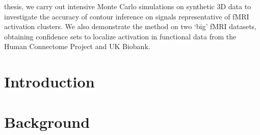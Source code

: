 \documentclass[11pt,a4paper]{report}      %
\begin{document}
\begin{thesisabstract}
\begin{singlespace}
thesis, we carry out intensive Monte Carlo simulations on synthetic 3D data to investigate the accuracy of contour inference on signals representative of fMRI activation clusters. We also demonstrate the method on two `big' fMRI datasets, obtaining confidence sets to localize activation in functional data from the Human Connectome Project and UK Biobank.	


\end{singlespace}
\end{thesisabstract}



\chapter{Introduction}


\chapter{Background}

\end{document}
